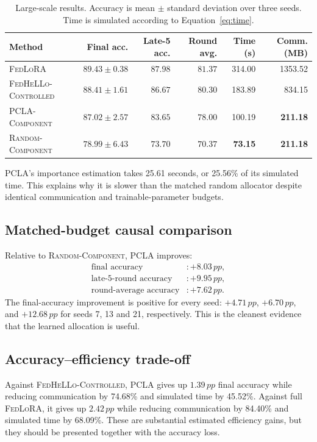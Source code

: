 \documentclass[11pt,a4paper]{article}
\newcommand{\method}{\textsc{PCLA-Component}}
\newcommand{\fedhello}{\textsc{FedHeLLo-Controlled}}
\newcommand{\fedlora}{\textsc{FedLoRA}}
\newcommand{\randomcomp}{\textsc{Random-Component}}
\newcommand{\pp}{\,pp}
\begin{document}
\begin{table}[htbp]
\centering
\caption{Large-scale results. Accuracy is mean $\pm$ standard deviation over
three seeds. Time is simulated according to Equation~\ref{eq:time}.}
\label{tab:results}
\small
\setlength{\tabcolsep}{5pt}
\begin{tabular}{lrrrrr}
\toprule
Method & Final acc. & Late-5 acc. & Round avg. & Time (s) & Comm. (MB)\\
\midrule
\fedlora
& $\mathbf{89.43\pm0.38}$ & $\mathbf{87.98}$ & $\mathbf{81.37}$
& 314.00 & 1353.52\\
\fedhello
& $88.41\pm1.61$ & $86.67$ & $80.30$
& 183.89 & 834.15\\
\method
& $87.02\pm2.57$ & $83.65$ & $78.00$
& 100.19 & \textbf{211.18}\\
\randomcomp
& $78.99\pm6.43$ & $73.70$ & $70.37$
& \textbf{73.15} & \textbf{211.18}\\
\bottomrule
\end{tabular}
\end{table}

PCLA's importance estimation takes 25.61 seconds, or 25.56\% of its simulated
time. This explains why it is slower than the matched random allocator despite
identical communication and trainable-parameter budgets.

\subsection{Matched-budget causal comparison}

Relative to \randomcomp{}, PCLA improves:
\begin{align*}
  \text{final accuracy} &: +8.03\pp,\\
  \text{late-5-round accuracy} &: +9.95\pp,\\
  \text{round-average accuracy} &: +7.62\pp.
\end{align*}
The final-accuracy improvement is positive for every seed:
$+4.71\pp$, $+6.70\pp$, and $+12.68\pp$ for seeds 7, 13 and 21,
respectively. This is the cleanest evidence that the learned allocation is
useful.

\subsection{Accuracy--efficiency trade-off}

Against \fedhello{}, PCLA gives up $1.39\pp$ final accuracy while reducing
communication by 74.68\% and simulated time by 45.52\%. Against full
\fedlora{}, it gives up $2.42\pp$ while reducing communication by 84.40\% and
simulated time by 68.09\%. These are substantial estimated efficiency gains,
but they should be presented together with the accuracy loss.
\end{document}
